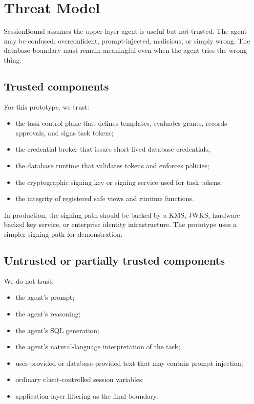 \documentclass[
]{article}
\providecommand{\tightlist}{%
  \setlength{\itemsep}{0pt}\setlength{\parskip}{0pt}}
\begin{document}
\hypertarget{threat-model}{%
\section{Threat Model}\label{threat-model}}

SessionBound assumes the upper-layer agent is useful but not trusted.
The agent may be confused, overconfident, prompt-injected, malicious, or
simply wrong. The database boundary must remain meaningful even when the
agent tries the wrong thing.

\hypertarget{trusted-components}{%
\subsection{Trusted components}\label{trusted-components}}

For this prototype, we trust:

\begin{itemize}
\tightlist
\item
  the task control plane that defines templates, evaluates grants,
  records approvals, and signs task tokens;
\item
  the credential broker that issues short-lived database credentials;
\item
  the database runtime that validates tokens and enforces policies;
\item
  the cryptographic signing key or signing service used for task tokens;
\item
  the integrity of registered safe views and runtime functions.
\end{itemize}

In production, the signing path should be backed by a KMS, JWKS,
hardware-backed key service, or enterprise identity infrastructure. The
prototype uses a simpler signing path for demonstration.

\hypertarget{untrusted-or-partially-trusted-components}{%
\subsection{Untrusted or partially trusted
components}\label{untrusted-or-partially-trusted-components}}

We do not trust:

\begin{itemize}
\tightlist
\item
  the agent's prompt;
\item
  the agent's reasoning;
\item
  the agent's SQL generation;
\item
  the agent's natural-language interpretation of the task;
\item
  user-provided or database-provided text that may contain prompt
  injection;
\item
  ordinary client-controlled session variables;
\item
  application-layer filtering as the final boundary.
\end{itemize}
\end{document}
